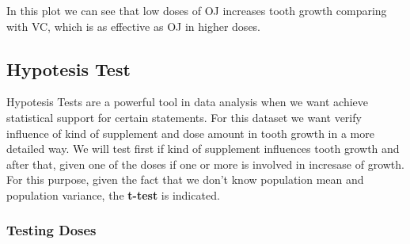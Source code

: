 \documentclass[a4paper, 12pt]{article}\usepackage[]{graphicx}\usepackage[]{color}
\begin{document}
In this plot we can see that low doses of OJ increases tooth growth comparing with VC, which is as effective as OJ in higher doses.

        \subsection{Hypotesis Test}
        Hypotesis Tests are a powerful tool in data analysis when we want achieve statistical support for certain statements.  For this dataset we want verify influence of kind of supplement and dose amount in tooth growth in a more detailed way.  We will test first if kind of supplement influences tooth growth and after that, given one of the doses if one or more is involved in incresase of growth.\\
        
        For this purpose, given the fact that we don't know population mean and population variance, the \textbf{t-test} is indicated.
                \subsubsection{Testing Doses}
\end{document}
